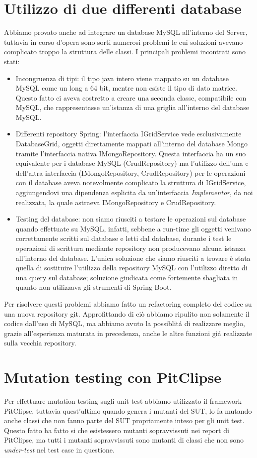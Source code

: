 \section{Utilizzo di due differenti database}
Abbiamo provato anche ad integrare un database MySQL all'interno del Server, tuttavia in corso d'opera sono sorti numerosi problemi le cui soluzioni avevano complicato troppo la struttura delle classi. I principali problemi incontrati sono stati:
\begin{itemize}
	\item Incongruenza di tipi: il tipo java intero viene mappato su un database MySQL come un long a 64 bit, mentre non esiste il tipo di dato matrice. Questo fatto ci aveva costretto a creare una seconda classe, compatibile con MySQL, che rappresentasse un'istanza di una griglia all'interno del database MySQL. 
	\item Differenti repository Spring: l'interfaccia IGridService vede esclusivamente DatabaseGrid, oggetti direttamente mappati all'interno del database Mongo tramite l'interfaccia nativa IMongoRepository. Questa interfaccia ha un suo equivalente per i database MySQL (CrudRepository) ma l'utilizzo dell'una e dell'altra interfaccia (IMongoRepository, CrudRepository) per le operazioni con il database aveva notevolmente complicato la struttura di IGridService, aggiungendovi una dipendenza esplicita da un'interfaccia \emph{Implementor}, da noi realizzata, la quale astraeva IMongoRepository e CrudRepository. 
	\item Testing del database: non siamo riusciti a testare le operazioni sul database quando effettuate su MySQL, infatti, sebbene a run-time gli oggetti venivano correttamente scritti sul database e letti dal database, durante i test le operazioni di scrittura mediante repository non producevano alcuna istanza all'interno del database. L'unica soluzione che siamo riusciti a trovare \`e stata quella di sostituire l'utilizzo della repository MySQL con l'utilizzo diretto di una query sul database; soluzione giudicata come fortemente sbagliata in quanto non utilizzava gli strumenti di Spring Boot.
\end{itemize} 
Per risolvere questi problemi abbiamo fatto un refactoring completo del codice su una nuova repository git. Approfittando di ci\`o abbiamo ripulito non solamente il codice dall'uso di MySQL, ma abbiamo avuto la possiblit\'a di realizzare meglio, grazie all'esperienza maturata in precedenza, anche le altre funzioni gi\'a realizzate sulla vecchia repository.
\section{Mutation testing con PitClipse}
Per effettuare mutation testing sugli unit-test abbiamo utilizzato il framework PitClipse, tuttavia quest'ultimo quando genera i mutanti del SUT, lo fa mutando anche classi che non fanno parte del SUT propriamente inteso per gli unit test. Questo fatto ha fatto si che esistessero mutanti sopravvissuti nei report di PitClipse, ma tutti i mutanti sopravvissuti sono mutanti di classi che non sono \emph{under-test} nel test case in questione.
